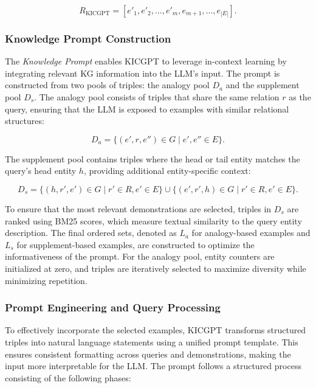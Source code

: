 \documentclass[12pt,a4paper]{article}
\begin{document}
\[
    R_{\text{KICGPT}} = [e'_1, e'_2, ..., e'_m, e_{m+1}, ..., e_{|E|}].
\]

\subsubsection{Knowledge Prompt Construction}

The \emph{Knowledge Prompt} enables KICGPT to leverage in-context learning by integrating relevant KG information into the LLM’s input.
The prompt is constructed from two pools of triples: the analogy pool \( D_a \) and the supplement pool \( D_s \).
The analogy pool consists of triples that share the same relation \( r \) as the query, ensuring that the LLM is exposed to examples with similar relational structures:

\[
    D_a = \{(e', r, e'') \in G \mid e', e'' \in E\}.
\]

The supplement pool contains triples where the head or tail entity matches the query's head entity \( h \), providing additional entity-specific context:

\[
    D_s = \{(h, r', e') \in G \mid r' \in R, e' \in E\} \cup \{(e', r', h) \in G \mid r' \in R, e' \in E\}.
\]

To ensure that the most relevant demonstrations are selected, triples in \( D_s \) are ranked using BM25 scores, which measure textual similarity to the query entity description.
The final ordered sets, denoted as \( L_a \) for analogy-based examples and \( L_s \) for supplement-based examples, are constructed to optimize the informativeness of the prompt.
For the analogy pool, entity counters are initialized at zero, and triples are iteratively selected to maximize diversity while minimizing repetition.

\subsubsection{Prompt Engineering and Query Processing}

To effectively incorporate the selected examples, KICGPT transforms structured triples into natural language statements using a unified prompt template.
This ensures consistent formatting across queries and demonstrations, making the input more interpretable for the LLM. The prompt follows a structured process consisting of the following phases:
\end{document}
